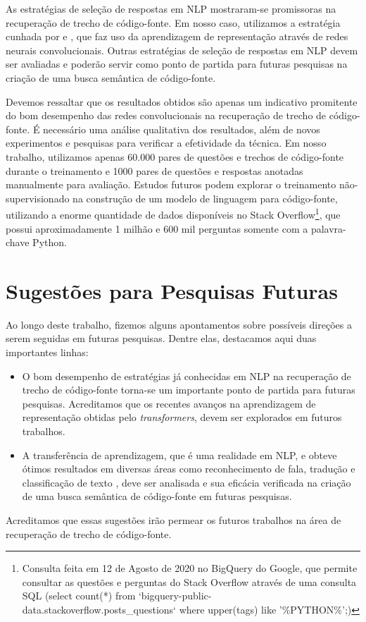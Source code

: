 As estratégias de seleção de respostas em NLP mostraram-se promissoras na recuperação de trecho de código-fonte. Em nosso caso, utilizamos a estratégia cunhada por \cite{feng-2015} e \cite{tan-lstm-qa}, que faz uso da aprendizagem de representação através de redes neurais convolucionais. Outras estratégias de seleção de respostas em NLP devem ser avaliadas e poderão servir como ponto de partida para futuras pesquisas na criação de uma busca semântica de código-fonte.

Devemos ressaltar que os resultados obtidos são apenas um indicativo promitente do bom desempenho das redes convolucionais na recuperação de trecho de código-fonte. É necessário uma análise qualitativa dos resultados, além de novos experimentos e pesquisas para verificar a efetividade da técnica. Em nosso trabalho, utilizamos apenas 60.000 pares de questões e trechos de código-fonte durante o treinamento e 1000 pares de questões e respostas anotadas manualmente para avaliação. Estudos futuros podem explorar o treinamento não-supervisionado na construção de um modelo de linguagem para código-fonte, utilizando a enorme quantidade de dados disponíveis no Stack Overflow\footnote{Consulta feita em 12 de Agosto de 2020 no BigQuery do Google, que permite consultar as questões e perguntas do Stack Overflow através de uma consulta SQL (select count(*) from `bigquery-public-data.stackoverflow.posts\_questions` where upper(tags) like '\%PYTHON\%';)}, que possui aproximadamente 1 milhão e 600 mil perguntas somente com a palavra-chave Python.



\section{Sugestões para Pesquisas Futuras} 

Ao longo deste trabalho, fizemos alguns apontamentos sobre possíveis direções a serem seguidas em futuras pesquisas. Dentre elas, destacamos aqui duas importantes linhas:

\begin{itemize}
    \item O bom desempenho de estratégias já conhecidas em NLP na recuperação de trecho de código-fonte torna-se um importante ponto de partida para futuras pesquisas. Acreditamos que os recentes avanços na aprendizagem de representação obtidas pelo \textit{transformers}, devem ser explorados em futuros trabalhos. 
    \item  A transferência de aprendizagem, que é uma realidade em NLP, e obteve ótimos resultados em diversas áreas como reconhecimento de fala, tradução e classificação de texto \cite{devlin-etal-2019-bert}, deve ser analisada e sua eficácia verificada na criação de uma busca semântica de código-fonte em futuras pesquisas.
\end{itemize}

Acreditamos que essas sugestões irão permear os futuros trabalhos na área de recuperação de trecho de código-fonte. 